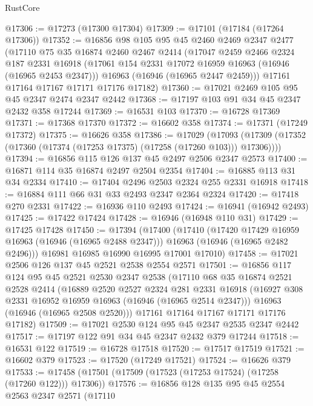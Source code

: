 \begin{lexlean}{RustCore}
\begin{coremodule}
@17306 := @17273 (@17300 @17304)
@17309 := @17101 (@17184 (@17264 @17306))
@17352 := @16856
    @98
    @105
    @95
    @45
    @2460
    @2469
    @2347
    @2477
    (@17110
      @75
      @35
      @16874
      @2460
      @2467
      @2414
      (@17047
        @2459
        @2466
        @2324
        @187
        @2331
        @16918
        (@17061 @154 @2331 @17072 @16959 @16963 (@16946 (@16965 @2453 @2347)))
        @16963
        (@16946 (@16965 @2447 @2459)))
      @17161
      @17164
      @17167
      @17171
      @17176
      @17182)
@17360 := @17021 @2469 @105 @95 @45 @2347 @2474 @2347 @2442
@17368 := @17197 @103 @91 @34 @45 @2347 @2432 @358 @17244
@17369 := @16531 @103
@17370 := @16728 @17369
@17371 := @17368 @17370
@17372 := @16602 @358
@17374 := @17371 (@17249 @17372)
@17375 := @16626 @358
@17386 := @17029
    (@17093 (@17309 (@17352 (@17360 (@17374 (@17253 @17375) (@17258 (@17260 @103))) @17306))))
@17394 := @16856 @115 @126 @137 @45 @2497 @2506 @2347 @2573
@17400 := @16871 @114 @35 @16874 @2497 @2504 @2354
@17404 := @16885 @113 @31 @34 @2334
@17410 := @17404 @2496 @2503 @2324 @255 @2331 @16918
@17418 := @16884 @111 @66 @31 @33 @2493 @2347 @2364 @2324
@17420 := @17418 @270 @2331
@17422 := @16936 @110 @2493
@17424 := @16941 (@16942 @2493)
@17425 := @17422 @17424
@17428 := @16946 (@16948 @110 @31)
@17429 := @17425 @17428
@17450 := @17394
    (@17400
      (@17410
        (@17420 @17429 @16959 @16963 (@16946 (@16965 @2488 @2347)))
        @16963
        (@16946 (@16965 @2482 @2496)))
      @16981
      @16985
      @16990
      @16995
      @17001
      @17010)
@17458 := @17021 @2506 @126 @137 @45 @2521 @2538 @2554 @2571
@17501 := @16856
    @117
    @124
    @95
    @45
    @2521
    @2530
    @2347
    @2538
    (@17110
      @68
      @35
      @16874
      @2521
      @2528
      @2414
      (@16889
        @2520
        @2527
        @2324
        @281
        @2331
        @16918
        (@16927 @308 @2331 @16952 @16959 @16963 (@16946 (@16965 @2514 @2347)))
        @16963
        (@16946 (@16965 @2508 @2520)))
      @17161
      @17164
      @17167
      @17171
      @17176
      @17182)
@17509 := @17021 @2530 @124 @95 @45 @2347 @2535 @2347 @2442
@17517 := @17197 @122 @91 @34 @45 @2347 @2432 @379 @17244
@17518 := @16531 @122
@17519 := @16728 @17518
@17520 := @17517 @17519
@17521 := @16602 @379
@17523 := @17520 (@17249 @17521)
@17524 := @16626 @379
@17533 := @17458 (@17501 (@17509 (@17523 (@17253 @17524) (@17258 (@17260 @122))) @17306))
@17576 := @16856
    @128
    @135
    @95
    @45
    @2554
    @2563
    @2347
    @2571
    (@17110

\end{coremodule}
\end{lexlean}
